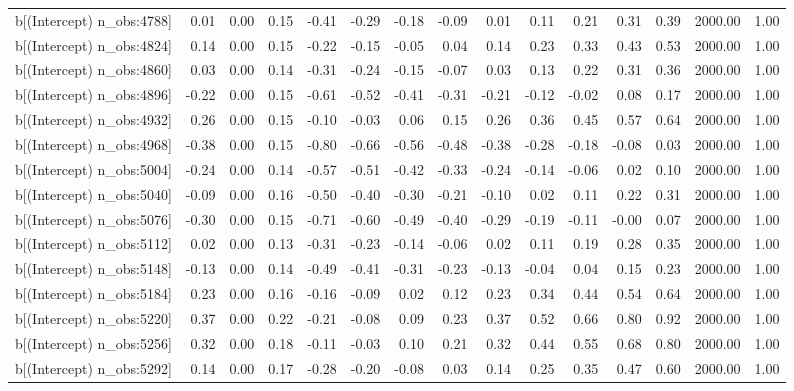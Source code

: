\begin{table}[ht]
\begin{tabular}{rrrrrrrrrrrrrrr}
  b[(Intercept) n\_obs:4788] & 0.01 & 0.00 & 0.15 & -0.41 & -0.29 & -0.18 & -0.09 & 0.01 & 0.11 & 0.21 & 0.31 & 0.39 & 2000.00 & 1.00 \\ 
  b[(Intercept) n\_obs:4824] & 0.14 & 0.00 & 0.15 & -0.22 & -0.15 & -0.05 & 0.04 & 0.14 & 0.23 & 0.33 & 0.43 & 0.53 & 2000.00 & 1.00 \\ 
  b[(Intercept) n\_obs:4860] & 0.03 & 0.00 & 0.14 & -0.31 & -0.24 & -0.15 & -0.07 & 0.03 & 0.13 & 0.22 & 0.31 & 0.36 & 2000.00 & 1.00 \\ 
  b[(Intercept) n\_obs:4896] & -0.22 & 0.00 & 0.15 & -0.61 & -0.52 & -0.41 & -0.31 & -0.21 & -0.12 & -0.02 & 0.08 & 0.17 & 2000.00 & 1.00 \\ 
  b[(Intercept) n\_obs:4932] & 0.26 & 0.00 & 0.15 & -0.10 & -0.03 & 0.06 & 0.15 & 0.26 & 0.36 & 0.45 & 0.57 & 0.64 & 2000.00 & 1.00 \\ 
  b[(Intercept) n\_obs:4968] & -0.38 & 0.00 & 0.15 & -0.80 & -0.66 & -0.56 & -0.48 & -0.38 & -0.28 & -0.18 & -0.08 & 0.03 & 2000.00 & 1.00 \\ 
  b[(Intercept) n\_obs:5004] & -0.24 & 0.00 & 0.14 & -0.57 & -0.51 & -0.42 & -0.33 & -0.24 & -0.14 & -0.06 & 0.02 & 0.10 & 2000.00 & 1.00 \\ 
  b[(Intercept) n\_obs:5040] & -0.09 & 0.00 & 0.16 & -0.50 & -0.40 & -0.30 & -0.21 & -0.10 & 0.02 & 0.11 & 0.22 & 0.31 & 2000.00 & 1.00 \\ 
  b[(Intercept) n\_obs:5076] & -0.30 & 0.00 & 0.15 & -0.71 & -0.60 & -0.49 & -0.40 & -0.29 & -0.19 & -0.11 & -0.00 & 0.07 & 2000.00 & 1.00 \\ 
  b[(Intercept) n\_obs:5112] & 0.02 & 0.00 & 0.13 & -0.31 & -0.23 & -0.14 & -0.06 & 0.02 & 0.11 & 0.19 & 0.28 & 0.35 & 2000.00 & 1.00 \\ 
  b[(Intercept) n\_obs:5148] & -0.13 & 0.00 & 0.14 & -0.49 & -0.41 & -0.31 & -0.23 & -0.13 & -0.04 & 0.04 & 0.15 & 0.23 & 2000.00 & 1.00 \\ 
  b[(Intercept) n\_obs:5184] & 0.23 & 0.00 & 0.16 & -0.16 & -0.09 & 0.02 & 0.12 & 0.23 & 0.34 & 0.44 & 0.54 & 0.64 & 2000.00 & 1.00 \\ 
  b[(Intercept) n\_obs:5220] & 0.37 & 0.00 & 0.22 & -0.21 & -0.08 & 0.09 & 0.23 & 0.37 & 0.52 & 0.66 & 0.80 & 0.92 & 2000.00 & 1.00 \\ 
  b[(Intercept) n\_obs:5256] & 0.32 & 0.00 & 0.18 & -0.11 & -0.03 & 0.10 & 0.21 & 0.32 & 0.44 & 0.55 & 0.68 & 0.80 & 2000.00 & 1.00 \\ 
  b[(Intercept) n\_obs:5292] & 0.14 & 0.00 & 0.17 & -0.28 & -0.20 & -0.08 & 0.03 & 0.14 & 0.25 & 0.35 & 0.47 & 0.60 & 2000.00 & 1.00 \\ 

\end{tabular}
\end{table}
